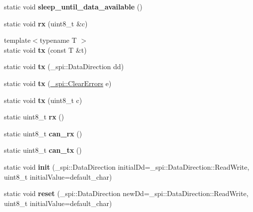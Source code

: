 \begin{DoxyCompactItemize}
\hypertarget{classSpiSlave_a22ea4c2e7dd73a8a3d4421ef1988fb6a}{}\label{classSpiSlave_a22ea4c2e7dd73a8a3d4421ef1988fb6a} 
static void {\bfseries sleep\+\_\+until\+\_\+data\+\_\+available} ()
\item 
\hypertarget{classSpiSlave_a56024a5c65f1621d6d6878442c63d0f8}{}\label{classSpiSlave_a56024a5c65f1621d6d6878442c63d0f8} 
static void {\bfseries rx} (uint8\+\_\+t \&c)
\item 
\hypertarget{classSpiSlave_a8b4d0097a955d25bed56bd828c01c2a3}{}\label{classSpiSlave_a8b4d0097a955d25bed56bd828c01c2a3} 
{\footnotesize template$<$typename T $>$ }\\static void {\bfseries tx} (const T \&t)
\item 
\hypertarget{classSpiSlave_aaaf2c74fb0b8332bc76e669e21ffd959}{}\label{classSpiSlave_aaaf2c74fb0b8332bc76e669e21ffd959} 
static void {\bfseries tx} (\+\_\+spi\+::\+Data\+Direction dd)
\item 
\hypertarget{classSpiSlave_ac7d9643f31fede2f24a49a4491e52732}{}\label{classSpiSlave_ac7d9643f31fede2f24a49a4491e52732} 
static void {\bfseries tx} (\hyperlink{class__transmission_1_1ClearErrors}{\+\_\+spi\+::\+Clear\+Errors} e)
\item 
\hypertarget{classSpiSlave_a7a93c5ee67495e9e2ab89dc36e70363b}{}\label{classSpiSlave_a7a93c5ee67495e9e2ab89dc36e70363b} 
static void {\bfseries tx} (uint8\+\_\+t c)
\item 
\hypertarget{classSpiSlave_a002a0eaf01ab45db97fa956f537c6264}{}\label{classSpiSlave_a002a0eaf01ab45db97fa956f537c6264} 
static uint8\+\_\+t {\bfseries rx} ()
\item 
\hypertarget{classSpiSlave_afd0d1035ca45ac012a54c3ff42e94985}{}\label{classSpiSlave_afd0d1035ca45ac012a54c3ff42e94985} 
static uint8\+\_\+t {\bfseries can\+\_\+rx} ()
\item 
\hypertarget{classSpiSlave_ae7c8db95f89ae369fd14601083dcf393}{}\label{classSpiSlave_ae7c8db95f89ae369fd14601083dcf393} 
static uint8\+\_\+t {\bfseries can\+\_\+tx} ()
\item 
\hypertarget{classSpiSlave_af970f2b3c7b0aa2e0c47d4848c39d2a7}{}\label{classSpiSlave_af970f2b3c7b0aa2e0c47d4848c39d2a7} 
static void {\bfseries init} (\+\_\+spi\+::\+Data\+Direction initial\+Dd=\+\_\+spi\+::\+Data\+Direction\+::\+Read\+Write, uint8\+\_\+t initial\+Value=default\+\_\+char)
\item 
\hypertarget{classSpiSlave_afa098a4ceeea041e478156d11774fa6e}{}\label{classSpiSlave_afa098a4ceeea041e478156d11774fa6e} 
static void {\bfseries reset} (\+\_\+spi\+::\+Data\+Direction new\+Dd=\+\_\+spi\+::\+Data\+Direction\+::\+Read\+Write, uint8\+\_\+t initial\+Value=default\+\_\+char)

\end{DoxyCompactItemize}
